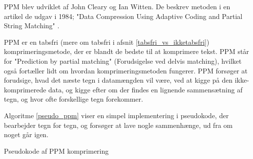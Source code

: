 PPM blev udviklet af John Cleary og Ian Witten. De beskrev metoden i en artikel de udgav i 1984; "Data Compression Using Adaptive Coding and Partial String Matching" \cite{Cleary84datacompression}.

PPM er en tabsfri (mere om tabsfri i afsnit \ref{tabsfri_vs_ikketabsfri}) komprimeringsmetode, der er blandt de bedste til at komprimere tekst. PPM står for "Prediction by partial matching" (Forudsigelse ved delvis matching), hvilket også fortæller lidt om hvordan komprimeringsmetoden fungerer. PPM forsøger at forudsige, hvad det næste tegn i datamængden vil være, ved at kigge på den ikke-komprimerede data, og kigge efter om der findes en lignende sammensætning af tegn, og hvor ofte forskellige tegn forekommer. 

Algoritme \ref{pseudo_ppm} viser en simpel implementering i pseudokode, der bearbejder tegn for tegn, og forsøger at lave nogle sammenhænge, ud fra om noget går igen.

\begin{algorithm}[H]
 \SetAlgoLined
\caption{Pseudokode af PPM komprimering \cite{ppm_stringology}}
\label{pseudo_ppm}
\end{algorithm}